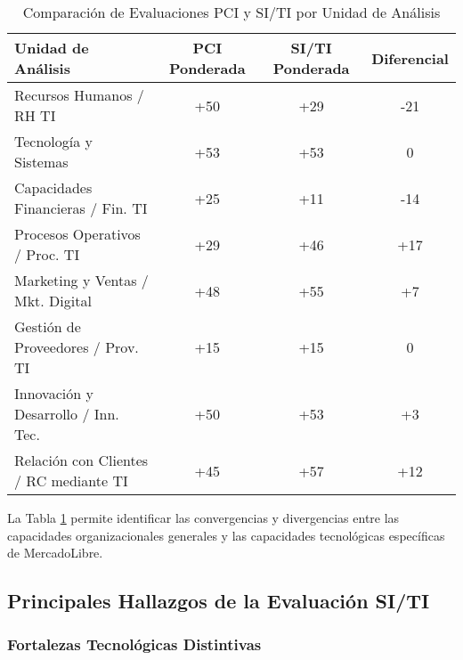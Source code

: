 \begin{table}[H]
\centering
\small
\begin{tabular}{|l|c|c|c|}
\hline
\textbf{Unidad de Análisis} & \textbf{PCI Ponderada} & \textbf{SI/TI Ponderada} & \textbf{Diferencial} \\
\hline
Recursos Humanos / RH TI & +50 & +29 & -21 \\
\hline
Tecnología y Sistemas & +53 & +53 & 0 \\
\hline
Capacidades Financieras / Fin. TI & +25 & +11 & -14 \\
\hline
Procesos Operativos / Proc. TI & +29 & +46 & +17 \\
\hline
Marketing y Ventas / Mkt. Digital & +48 & +55 & +7 \\
\hline
Gestión de Proveedores / Prov. TI & +15 & +15 & 0 \\
\hline
Innovación y Desarrollo / Inn. Tec. & +50 & +53 & +3 \\
\hline
Relación con Clientes / RC mediante TI & +45 & +57 & +12 \\
\hline
\end{tabular}
\caption{Comparación de Evaluaciones PCI y SI/TI por Unidad de Análisis}
\label{tab:comparacion_pci_siti}
\end{table}

La Tabla \ref{tab:comparacion_pci_siti} permite identificar las convergencias y divergencias entre las capacidades organizacionales generales y las capacidades tecnológicas específicas de MercadoLibre.

\subsection{Principales Hallazgos de la Evaluación SI/TI}

\subsubsection{Fortalezas Tecnológicas Distintivas}


